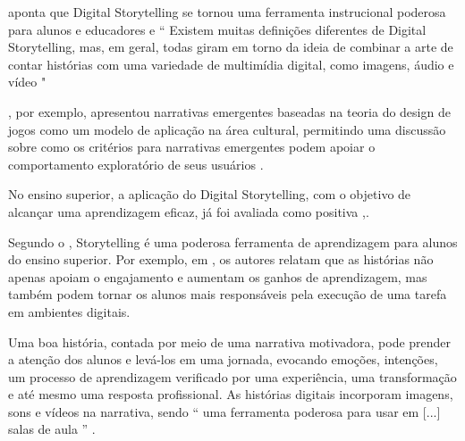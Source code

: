 \citet{robin_educational_2006} aponta que Digital Storytelling se tornou uma ferramenta instrucional poderosa para alunos e educadores e `` Existem muitas definições diferentes de Digital Storytelling, mas, em geral, todas giram em torno da ideia de combinar a arte de contar histórias com uma variedade de multimídia digital, como imagens, áudio e vídeo "

\citet{madsen_how_2020}, por exemplo, apresentou narrativas emergentes baseadas na teoria do design de jogos como um modelo de aplicação na área cultural, permitindo uma discussão sobre como os critérios para narrativas emergentes podem apoiar o comportamento exploratório de seus usuários \citep{madsen_how_2020}.

No ensino superior, a aplicação do Digital Storytelling, com o objetivo de alcançar uma aprendizagem eficaz, já foi avaliada como positiva \citep{bechter_digital_2017},\citep{robin_educational_2006}.

Segundo o \citet{alterio_learning_2016}, Storytelling é uma poderosa ferramenta de aprendizagem para alunos do ensino superior. Por exemplo, em \citet{shelton_exploring_2016}, os autores relatam que as histórias não apenas apoiam o engajamento e aumentam os ganhos de aprendizagem, mas também podem tornar os alunos mais responsáveis pela execução de uma tarefa em ambientes digitais.

Uma boa história, contada por meio de uma narrativa motivadora, pode prender a atenção dos alunos e levá-los em uma jornada, evocando emoções, intenções, um processo de aprendizagem verificado por uma experiência, uma transformação e até mesmo uma resposta profissional. As histórias digitais incorporam imagens, sons e vídeos na narrativa, sendo `` uma ferramenta poderosa para usar em [...] salas de aula '' \citep{robin_educational_2006} \citep{robin_digital_2008}.
